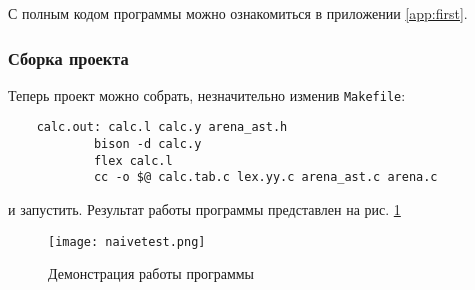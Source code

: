 С полным кодом программы можно ознакомиться в приложении \ref{app:first}.

\subsubsection{Сборка проекта}
Теперь проект можно собрать, незначительно изменив \verb|Makefile|:

\begin{verbatim}
    calc.out: calc.l calc.y arena_ast.h
            bison -d calc.y
            flex calc.l
            cc -o $@ calc.tab.c lex.yy.c arena_ast.c arena.c
\end{verbatim}
и запустить. Результат работы программы представлен на рис. \ref{fig:six}
\begin{figure}[H]
    \centering
    \texttt{[image: naivetest.png]}
    \caption{Демонстрация работы программы}
    \label{fig:six}
\end{figure}
